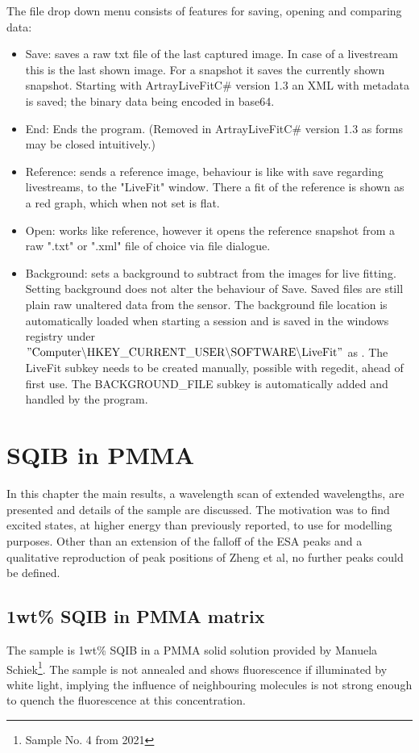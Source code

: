 \documentclass[twoside,openright,listof=numbered]{scrreprt}
\begin{document}
The file drop down menu consists of features for saving, opening and comparing data:
\begin{itemize}
\item Save: saves a raw txt file of the last captured image. In case of a livestream this is the last shown image. For a snapshot it saves the currently shown snapshot. Starting with ArtrayLiveFitC\# version 1.3 an XML with metadata is saved; the binary data being encoded in base64.
\item End: Ends the program. (Removed in ArtrayLiveFitC\# version 1.3 as forms may be closed intuitively.)
\item Reference: sends a reference image, behaviour is like with save regarding livestreams, to the "LiveFit" window. There a fit of the reference is shown as a red graph, which when not set is flat.
\item Open: works like reference, however it opens the reference snapshot from a raw ".txt" or ".xml" file of choice via file dialogue.
\item Background: sets a background to subtract from the images for live fitting. Setting background does not alter the behaviour of Save. Saved files are still plain raw unaltered data from the sensor. The background file location is automatically loaded when starting a session and is saved in the windows registry under $\mathrm{"Computer \backslash HKEY\_CURRENT\_USER \backslash SOFTWARE \backslash LiveFit"}$ as . The LiveFit subkey needs to be created manually, possible with regedit, ahead of first use. The BACKGROUND\_FILE subkey is automatically added and handled by the program.
\end{itemize}


\chapter{SQIB in PMMA}\label{chpt:results}
In this chapter the main results, a wavelength scan of extended wavelengths, are presented and details of the sample are discussed. The motivation was to find excited states, at higher energy than previously reported, to use for modelling purposes. Other than an extension of the falloff of the ESA peaks and a qualitative reproduction of peak positions of Zheng et al\cite{Zheng2020}, no further peaks could be defined.

\section{1wt\% SQIB in PMMA matrix}
The sample is 1wt\% SQIB in a PMMA solid solution provided by Manuela Schiek\footnote{Sample No. 4 from 2021}. The sample is not annealed and shows fluorescence if illuminated by white light, implying the influence of neighbouring molecules is not strong enough to quench the fluorescence at this concentration. \\
\end{document}
